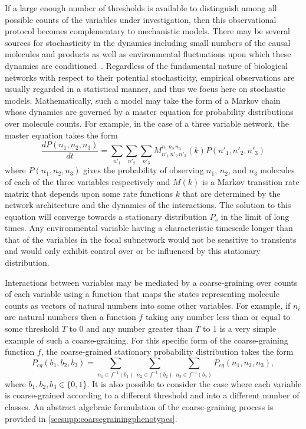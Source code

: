 If a large enough number of thresholds is available to distinguish among all possible counts of the variables under investigation, then this observational protocol becomes complementary to mechanistic models.  There may be several sources for stochasticity in the dynamics including small numbers of the causal molecules and products as well as environmental fluctuations upon which these dynamics are conditioned~\cite{Swain2002,Paulsson2004,Thattai2004,Acar2008a,Lestas2010,Munsky2012,Chalancon2012,Neuert2013,Sanchez2013}. Regardless of the fundamental nature of biological networks with respect to their potential stochasticity, empirical observations are usually regarded in a statistical manner, and thus we focus here on stochastic models.
Mathematically, such a model may take the form of a Markov chain whose dynamics are governed by a master equation for probability distributions over molecule counts. For example, in the case of a three variable network, the master equation takes the form
$$
\frac{dP(n_1,n_2,n_3)}{dt} = \sum_{n'_1}\sum_{n'_2}\sum_{n'_3} M^{n_1\,n_2\,n_3}_{n'_1\,n'_2\,n'_3}(k) P(n'_1,n'_2,n'_3)
$$
where $P(n_1,n_2,n_3)$ gives the probability of observing $n_1$, $n_2$, and $n_3$ molecules of each of the three variables respectively and $M(k)$ is a Markov transition rate matrix that depends upon some rate functions $k$ that are determined by the network architecture and the dynamics of the interactions.  The solution to this equation will converge towards a stationary distribution $P_s$ in the limit of long times. Any environmental variable having a characteristic timescale longer than that of the variables in the focal subnetwork would not be sensitive to transients and would only exhibit control over or be influenced by this stationary distribution.

Interactions between variables may be mediated by a coarse-graining over counts of each variable using a function that maps the states representing molecule counts as vectors of natural numbers into some other variables. For example, if $n_i$ are natural numbers
then a function $f$ taking any number less than or equal to some threshold $T$ to $0$ and any number greater than $T$ to $1$ is a very simple example of such a coarse-graining. For this specific form of the coarse-graining function $f$, the coarse-grained stationary probability distribution takes the form
$$
P_{cg}(b_1,b_2,b_3) = \sum_{n_1 \in f^{-1}(b_1)}\sum_{n_2 \in f^{-1}(b_2)}\sum_{n_3 \in f^{-1}(b_3)} P_{cg}(n_1,n_2,n_3),
$$
where $b_1,b_2,b_3 \in \{ 0,1 \}$. It is also possible to consider the case where each variable is coarse-grained according to a different threshold and into a different number of classes. An abstract algebraic formulation of the coarse-graining process is provided in  \autoref{secsupp:coarsegrainingphenotypes}.

